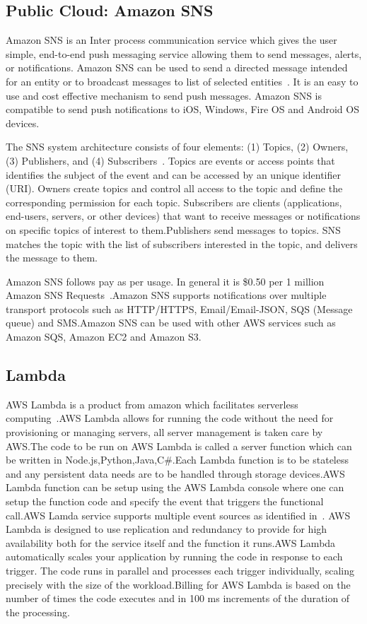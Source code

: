 \subsection{Public Cloud: Amazon SNS}

Amazon SNS is an Inter process communication service which gives the
user simple, end-to-end push messaging service allowing them to send
messages, alerts, or notifications. Amazon SNS can be used to send a
directed message intended for an entity or to broadcast messages to
list of selected entities~\cite{www-sns-webpage}.  It is an easy to
use and cost effective mechanism to send push messages. Amazon SNS is
compatible to send push notifications to iOS, Windows, Fire OS and
Android OS devices.

The SNS system architecture consists of four elements: (1) Topics, (2)
Owners, (3) Publishers, and (4)
Subscribers~\cite{www-sns-blog}. Topics are events or access points
that identifies the subject of the event and can be accessed by an
unique identifier (URI). Owners create topics and control all access
to the topic and define the corresponding permission for each
topic. Subscribers are clients (applications, end-users, servers, or
other devices) that want to receive messages or notifications on
specific topics of interest to them.Publishers send messages to
topics. SNS matches the topic with the list of subscribers interested
in the topic, and delivers the message to them.

Amazon SNS follows pay as per usage. In general it is \$0.50 per 1
million Amazon SNS Requests~\cite{www-sns-faq}.Amazon SNS supports
notifications over multiple transport protocols such as HTTP/HTTPS,
Email/Email-JSON, SQS (Message queue) and SMS.Amazon SNS can be used
with other AWS services such as Amazon SQS, Amazon EC2 and Amazon S3.

     \pv

\subsection{Lambda}

AWS Lambda is a product from amazon which facilitates serverless
computing~\cite{www-awslambda}.AWS Lambda allows for running the code
without the need for provisioning or managing servers, all server
management is taken care by AWS.The code to be run on AWS Lambda is
called a server function which can be written in
Node.js,Python,Java,C\#.Each Lambda function is to be stateless and
any persistent data needs are to be handled through storage
devices.AWS Lambda function can be setup using the AWS Lambda console
where one can setup the function code and specify the event that
triggers the functional call.AWS Lamda service supports multiple event
sources as identified in~\cite{www-awslambdaevent}. AWS Lambda is
designed to use replication and redundancy to provide for high
availability both for the service itself and the function it runs.AWS
Lambda automatically scales your application by running the code in
response to each trigger. The code runs in parallel and processes each
trigger individually, scaling precisely with the size of the
workload.Billing for AWS Lambda is based on the number of times the
code executes and in 100 ms increments of the duration of the
processing.

